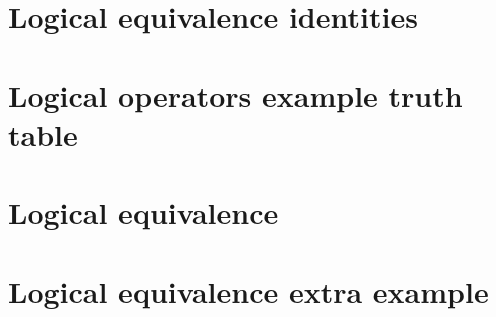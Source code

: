 
\section*{Logical equivalence identities}

\vfill
\section*{Logical operators example truth table}

\vfill
\section*{Logical equivalence}

\vfill
\section*{Logical equivalence extra example}

\vfill
